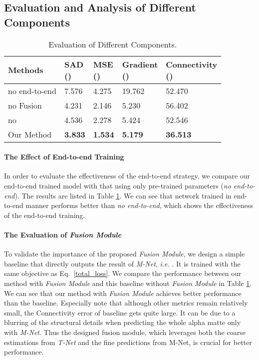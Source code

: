 \subsection{Evaluation and Analysis of Different Components}

\begin{table}
  \caption{Evaluation of Different Components.}
  \label{tab:ablation_study}
  \begin{tabular}{lllll}
    \toprule
Methods & \tabincell{c}{SAD \\ ()} & \tabincell{c}{MSE \\ ()} & \tabincell{c}{Gradient \\ ()} & \tabincell{c}{Connectivity \\ ()} \\
    \midrule
    no end-to-end & 7.576 & 4.275 & 19.762 & 52.470\\
    no Fusion & 4.231 & 2.146 & 5.230 & 56.402\\
    no  & 4.536 & 2.278 & 5.424 & 52.546 \\
    \midrule
    Our Method & \textbf{3.833} & \textbf{1.534} & \textbf{5.179} & \textbf{36.513}\\
  \bottomrule
\end{tabular}
\end{table}


\paragraph{\textbf{The Effect of End-to-end Training}}
In order to evaluate the effectiveness of the end-to-end strategy,
we compare our end-to-end trained model with that using only pre-trained parameters (\emph{no end-to-end}).
The results are listed in Table \ref{tab:ablation_study}. 
We can see that network trained in end-to-end manner performs better than \emph{no end-to-end}, which shows the effectiveness of the end-to-end training.

\paragraph{\textbf{The Evaluation of \emph{Fusion Module}}}
To validate the importance of the proposed \emph{Fusion Module}, we design a simple baseline that directly outputs the result of \emph{M-Net}, \emph{i.e.} .
It is trained with the same objective as Eq.~\ref{total_loss}.
We compare the performance between our method with \emph{Fusion Module} and this baseline without \emph{Fusion Module} in Table \ref{tab:ablation_study}.
We can see that our method with \emph{Fusion Module} achieves better performance than the baseline. 
Especially note that although other metrics remain relatively small, the Connectivity error of baseline gets quite large.
It can be due to a blurring of the structural details when predicting the whole alpha matte only with \emph{M-Net}.
Thus the designed fusion module, which leverages both the coarse estimations from \emph{T-Net} and the fine predictions from M-Net, is crucial for better performance.

